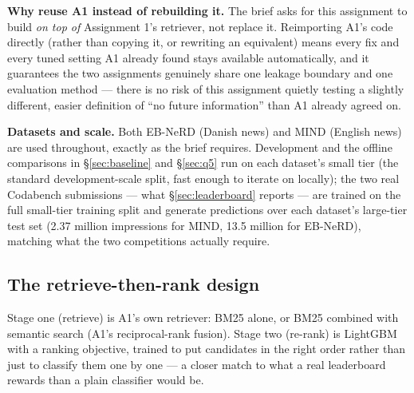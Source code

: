 \documentclass[11pt,a4paper]{article}
\begin{document}
\textbf{Why reuse A1 instead of rebuilding it.} The brief asks for this assignment to build
\emph{on top of} Assignment 1's retriever, not replace it. Reimporting A1's code directly (rather
than copying it, or rewriting an equivalent) means every fix and every tuned setting A1 already
found stays available automatically, and it guarantees the two assignments genuinely share one
leakage boundary and one evaluation method --- there is no risk of this assignment quietly testing
a slightly different, easier definition of ``no future information'' than A1 already agreed on.

\textbf{Datasets and scale.} Both EB-NeRD (Danish news) and MIND (English news) are used
throughout, exactly as the brief requires. Development and the offline comparisons in
\S\ref{sec:baseline} and \S\ref{sec:q5} run on each dataset's small tier (the standard
development-scale split, fast enough to iterate on locally); the two real Codabench submissions
--- what \S\ref{sec:leaderboard} reports --- are trained on the full small-tier training split and
generate predictions over each dataset's large-tier test set (2.37 million impressions for MIND,
13.5 million for EB-NeRD), matching what the two competitions actually require.

\subsection{The retrieve-then-rank design}

Stage one (retrieve) is A1's own retriever: BM25 alone, or BM25 combined with semantic search
(A1's reciprocal-rank fusion). Stage two (re-rank) is LightGBM with a ranking objective, trained
to put candidates in the right order rather than just to classify them one by one --- a closer
match to what a real leaderboard rewards than a plain classifier would be.

\begin{center}
\end{center}
\end{document}
